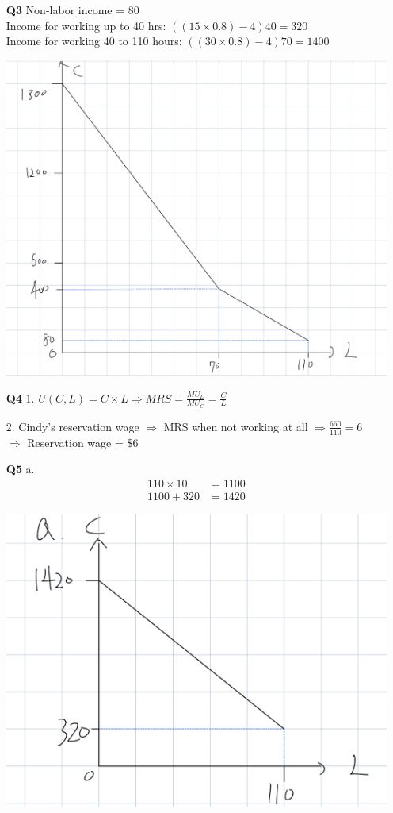 \documentclass[12pt]{article}
\begin{document}
\begin{enumerate}
    \item[\textbf{Q3}] 
    Non-labor income = 80\\
    Income for working up to 40 hrs: $((15 \times 0.8)-4)40 = 320$\\
    Income for working 40 to 110 hours: $((30 \times 0.8)-4)70 = 1400$
    
    \includegraphics[width=0.8\linewidth]{截圖 2023-11-04 上午4.02.53.png}
        
    \item[\textbf{Q4}] 
    1. $U(C,L) = C \times L \Rightarrow MRS = \frac{MU_L}{MU_C} = \frac{C}{L}$ 
    
    2. Cindy's reservation wage $\Rightarrow$ MRS when not working at all $\Rightarrow \frac{660}{110} = 6$\\
    $\Rightarrow$ Reservation wage = $\$6$
    
    \item[\textbf{Q5}] 
    a. 
    \begin{align*} 
    110 \times 10 &=  1100 \\ 
    1100 + 320 &=  1420
    \end{align*}
    
    \includegraphics[width=1\linewidth]{IMG_E2C6480C7225-1.jpeg}


\end{enumerate}
\end{document}
